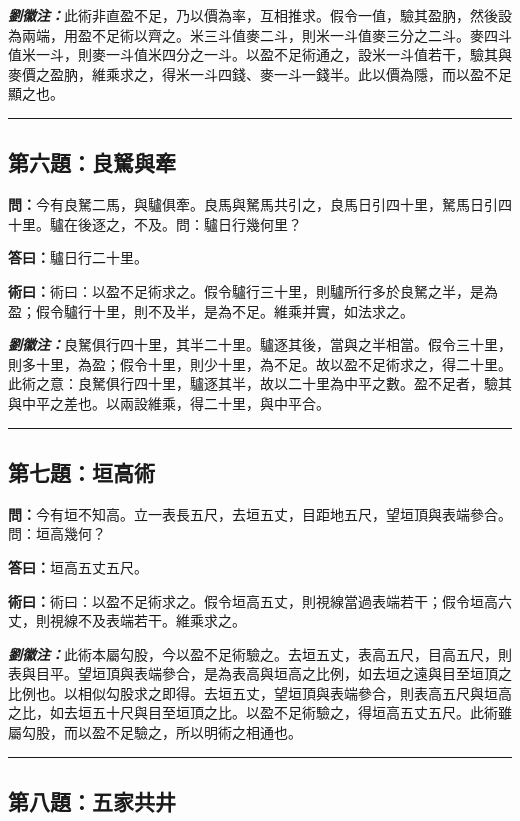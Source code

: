 \documentclass[11pt,a4paper]{article}
\newcommand{\wen}[1]{\textbf{\color{problemcolor}問：}#1\par}
\newcommand{\da}[1]{\textbf{答曰：}#1\par}
\newcommand{\shu}[1]{\textbf{術曰：}#1\par}
\newcommand{\liuhui}[1]{{\color{commentarycolor}\textit{\textbf{劉徽注：}}#1\par}}
\begin{document}
\liuhui{此術非直盈不足，乃以價為率，互相推求。假令一值，驗其盈肭，然後設為兩端，用盈不足術以齊之。米三斗值麥二斗，則米一斗值麥三分之二斗。麥四斗值米一斗，則麥一斗值米四分之一斗。以盈不足術通之，設米一斗值若干，驗其與麥價之盈肭，維乘求之，得米一斗四錢、麥一斗一錢半。此以價為隱，而以盈不足顯之也。}

\bigskip
\hrule
\bigskip

\subsection{第六題：良駑與牽}

\wen{今有良駑二馬，與驢俱牽。良馬與駑馬共引之，良馬日引四十里，駑馬日引四十里。驢在後逐之，不及。問：驢日行幾何里？}

\da{驢日行二十里。}

\shu{術曰：以盈不足術求之。假令驢行三十里，則驢所行多於良駑之半，是為盈；假令驢行十里，則不及半，是為不足。維乘并實，如法求之。}

\liuhui{良駑俱行四十里，其半二十里。驢逐其後，當與之半相當。假令三十里，則多十里，為盈；假令十里，則少十里，為不足。故以盈不足術求之，得二十里。此術之意：良駑俱行四十里，驢逐其半，故以二十里為中平之數。盈不足者，驗其與中平之差也。以兩設維乘，得二十里，與中平合。}

\bigskip
\hrule
\bigskip

\subsection{第七題：垣高術}

\wen{今有垣不知高。立一表長五尺，去垣五丈，目距地五尺，望垣頂與表端參合。問：垣高幾何？}

\da{垣高五丈五尺。}

\shu{術曰：以盈不足術求之。假令垣高五丈，則視線當過表端若干；假令垣高六丈，則視線不及表端若干。維乘求之。}

\liuhui{此術本屬勾股，今以盈不足術驗之。去垣五丈，表高五尺，目高五尺，則表與目平。望垣頂與表端參合，是為表高與垣高之比例，如去垣之遠與目至垣頂之比例也。以相似勾股求之即得。去垣五丈，望垣頂與表端參合，則表高五尺與垣高之比，如去垣五十尺與目至垣頂之比。以盈不足術驗之，得垣高五丈五尺。此術雖屬勾股，而以盈不足驗之，所以明術之相通也。}

\bigskip
\hrule
\bigskip

\subsection{第八題：五家共井}
\end{document}
